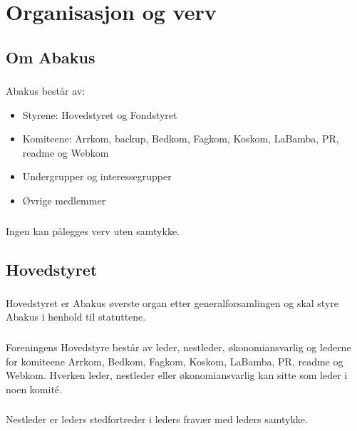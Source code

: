 \section{Organisasjon og verv}
\subsection{Om Abakus}

\subsubsection{}
Abakus består av:

\begin{itemize}
\item Styrene: Hovedstyret og Fondstyret
\item Komiteene: Arrkom, backup, Bedkom, Fagkom, Koskom, LaBamba, PR, readme og Webkom
\item Undergrupper og interessegrupper
\item Øvrige medlemmer
\end{itemize}

\subsubsection{}
Ingen kan pålegges verv uten samtykke.

\subsection{Hovedstyret}

\subsubsection{}
Hovedstyret er Abakus øverste organ etter generalforsamlingen og skal styre
Abakus i henhold til statuttene.

\subsubsection{}
Foreningens Hovedstyre består av leder, nestleder, økonomiansvarlig og
lederne for komiteene Arrkom, Bedkom, Fagkom, Koskom, LaBamba, PR, readme og Webkom.
Hverken leder, nestleder eller økonomiansvarlig kan sitte som leder i noen komité.

\subsubsection{}
Nestleder er leders stedfortreder i leders fravær med leders samtykke.

